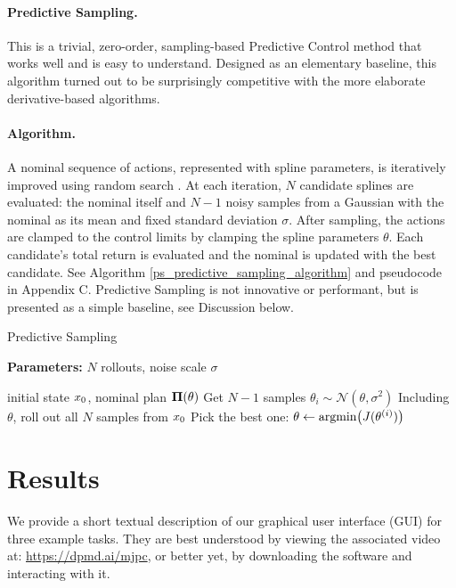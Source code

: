 \paragraph{Predictive Sampling.}

This is a trivial, zero-order, sampling-based Predictive Control method that works well and is easy to understand. Designed as an elementary baseline, this algorithm turned out to be surprisingly competitive with the more elaborate derivative-based algorithms.

\paragraph{Algorithm.} A nominal sequence of actions, represented with spline parameters, is iteratively improved using random search \cite{matyas1965random}. At each iteration, $N$ candidate splines are evaluated: the nominal itself and $N-1$ noisy samples from a Gaussian with the nominal as its mean and fixed standard deviation $\sigma$. After sampling, the actions are clamped to the control limits by clamping the spline parameters $\theta$. Each candidate's total return is evaluated and the nominal is updated with the best candidate. See Algorithm \ref{ps_predictive_sampling_algorithm} and pseudocode in Appendix C. Predictive Sampling is not innovative or performant, but is presented as a simple baseline, see Discussion below.

\begin{algorithm}[H]
	\caption{Predictive Sampling}\label{ps_predictive_sampling_algorithm}
	\textbf{Parameters:} $N$ rollouts, noise scale $\sigma$
	\begin{algorithmic}[1]
		\Require initial state ${x}_0$, nominal plan ${\mathbf{\Pi}}(\theta)$
		\State Get $N\!-\!1$ samples $\theta_i \sim \mathcal{N}(\theta, \sigma^2)$
		\State Including $\theta$, roll out all $N$ samples from ${x}_0$
		\State Pick the best one: $\theta \leftarrow \mbox{argmin} \bigl({J}(\theta^{(i)})\bigr)$
	\end{algorithmic}
\end{algorithm}

\section{Results} \label{ps_results}

We provide a short textual description of our graphical user interface (GUI) for three example tasks. They are best understood by viewing the associated video at: \url{https://dpmd.ai/mjpc}, or better yet, by downloading the software and interacting with it. 

